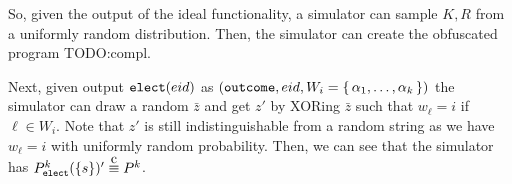 So, given the output of the ideal functionality, a simulator can sample $K, R$ from a uniformly random distribution.
Then, the simulator can create the obfuscated program  TODO:compl.

Next, given output $\texttt{elect}({eid})$ as $(\texttt{outcome}, {eid}, W_i = \set{\alpha_1, \dots, \alpha_k})$
the simulator can draw a random $\bar{z}$ and get $z'$ by XORing $\bar{z}$ such that $w_\ell = i$ if
$\ell \in W_i$. Note that $z'$ is still indistinguishable from a random string as we have $w_\ell = i$ with uniformly
random probability.
Then, we can see that the simulator has $P^k_\elect(\{s\})' \compInd P^k$.
